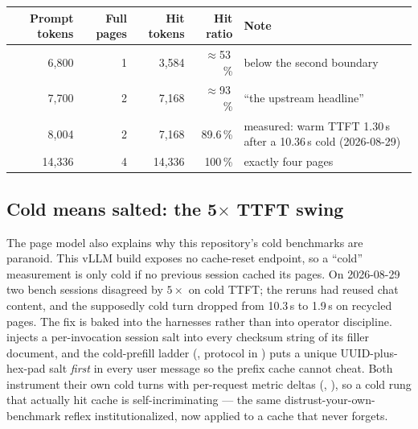 \begin{center}
\small
{}
\label{tab:proof-hits}
\begin{tabular}{@{}rrrr>{\raggedright\arraybackslash}p{4.0cm}@{}}
\toprule
Prompt tokens & Full pages & Hit tokens & Hit ratio & Note \\
\midrule
6{,}800 & 1 & 3{,}584 & $\approx$53\,\% & below the second boundary \\
7{,}700 & 2 & 7{,}168 & $\approx$93\,\% & ``the upstream headline'' \\
8{,}004 & 2 & 7{,}168 & 89.6\,\% & measured: warm TTFT 1.30\,s after a
  10.36\,s cold (2026-08-29) \\
14{,}336 & 4 & 14{,}336 & 100\,\% & exactly four pages \\
\bottomrule
\end{tabular}
\end{center}

\subsection{Cold means salted: the 5$\times$ TTFT swing}

The page model also explains why this repository's cold benchmarks are paranoid.
This vLLM build exposes no cache-reset endpoint, so a ``cold'' measurement is
only cold if no previous session cached its pages. On 2026-08-29 two bench
sessions disagreed by $5\times$ on cold TTFT; the reruns had reused chat
content, and the supposedly cold turn dropped from 10.3\,s to 1.9\,s on
recycled pages. The fix is baked into the harnesses rather than into
operator discipline.  injects a
per-invocation session salt into every checksum string of its filler
document, and the cold-prefill ladder
(, protocol in
) puts a unique UUID-plus-hex-pad salt
\emph{first} in every user message so the prefix cache cannot cheat. Both
instrument their own cold turns with per-request metric deltas
(,
), so a cold
rung that actually hit cache is self-incriminating --- the same
distrust-your-own-benchmark reflex  institutionalized, now applied
to a cache that never forgets.

